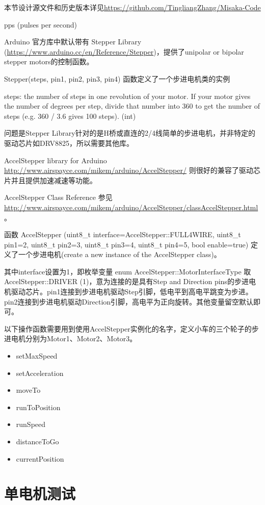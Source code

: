 本节设计源文件和历史版本详见\url{https://github.com/TingliangZhang/Misaka-Code}

pps (pulses per second)

Arduino 官方库中默认带有 Stepper Library (\url{https://www.arduino.cc/en/Reference/Stepper})，提供了unipolar or bipolar stepper motors的控制函数。

Stepper(steps, pin1, pin2, pin3, pin4) 函数定义了一个步进电机类的实例

steps: the number of steps in one revolution of your motor. If your motor gives the number of degrees per step, divide that number into 360 to get the number of steps (e.g. 360 / 3.6 gives 100 steps). (int)

问题是Stepper Library针对的是H桥或直连的2/4线简单的步进电机，并非特定的驱动芯片如DRV8825，所以需要其他库。

AccelStepper library for Arduino \url{http://www.airspayce.com/mikem/arduino/AccelStepper/} 则很好的兼容了驱动芯片并且提供加速减速等功能。

AccelStepper Class Reference 参见 \url{http://www.airspayce.com/mikem/arduino/AccelStepper/classAccelStepper.html} 。

函数 AccelStepper (uint8\_t interface=AccelStepper::FULL4WIRE, uint8\_t pin1=2, uint8\_t pin2=3, uint8\_t pin3=4, uint8\_t pin4=5, bool enable=true) 定义了一个步进电机(create a new instance of the AccelStepper class)。

其中interface设置为1，即枚举变量 enum AccelStepper::MotorInterfaceType 取AccelStepper::DRIVER (1)，意为连接的是具有Step and Direction pins的步进电机驱动芯片。pin1连接到步进电机驱动Step引脚，低电平到高电平跳变为步进。pin2连接到步进电机驱动Direction引脚，高电平为正向旋转。其他变量留空默认即可。

以下操作函数需要用到使用AccelStepper实例化的名字，定义小车的三个轮子的步进电机分别为Motor1、Motor2、Motor3。

\begin{itemize}
    \item setMaxSpeed
    \item setAcceleration
    \item moveTo
    \item runToPosition
    \item runSpeed
    \item distanceToGo
    \item currentPosition
\end{itemize}


\section{单电机测试}

